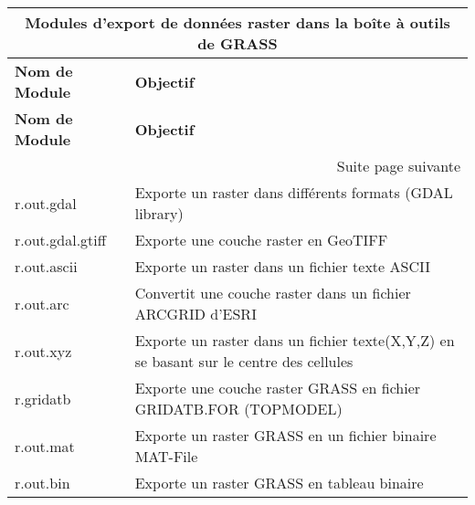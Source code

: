 \begin{center}
{\setlength{\extrarowheight}{10pt}
\small
\begin{longtable}{|p{2.5cm}|p{11.5cm}|}
  \hline \multicolumn{2}{|c|}{\textbf{Modules d'export de données raster dans la boîte à outils de GRASS}} \\ 
\hline \textbf{Nom de Module}&\textbf{Objectif}\\
\endfirsthead
\hline \textbf{Nom de Module}&\textbf{Objectif}\\
\endhead
\hline \multicolumn{2}{|r|}{{Suite page suivante}} \\ \hline
\endfoot
\endlastfoot
  \hline r.out.gdal & Exporte un raster dans différents formats (GDAL library) \\
  \hline r.out.gdal.gtiff & Exporte une couche raster en GeoTIFF \\
  \hline r.out.ascii & Exporte un raster dans un fichier texte ASCII \\
  \hline r.out.arc & Convertit une couche raster dans un fichier ARCGRID d'ESRI \\
  \hline r.out.xyz & Exporte un raster dans un fichier texte(X,Y,Z) en se basant sur le centre des cellules \\
  \hline r.gridatb & Exporte une couche raster GRASS en fichier GRIDATB.FOR (TOPMODEL) \\
  \hline r.out.mat & Exporte un raster GRASS en un fichier binaire MAT-File \\
  \hline r.out.bin & Exporte un raster GRASS en tableau binaire \\

\end{longtable}}
\end{center}
